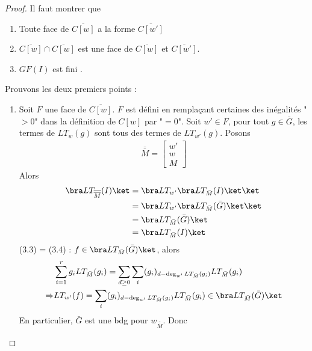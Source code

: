         \begin{proof}
            Il faut montrer que
            \begin{enumerate}
                \item Toute face de $\overline{C[w]}$ a la forme $\overline{C[w']}$
                \item $\overline{C[w]} \cap \overline{C[w]}$ est une face de $\overline{C[w]}$ et $\overline{C[w']}$.
                \item $GF(I)$ est fini .
            \end{enumerate}
            Prouvons les deux premiers points :
            \begin{enumerate}
                \item Soit $F$ une face de $\overline{C[w]}$. $F$ est défini en remplaçant certaines des inégalités "$>0$" dans la définition de $C[w]$ par "$=0$". Soit $w' \in F$, pour tout $g \in \bar G$, les termes de $LT_w(g)$ sont tous des termes de $LT_{w'}(g)$. Posons
                \begin{align*}
                    \overline{\overline{M}} = \begin{bmatrix} w' \\ w \\ M \end{bmatrix}
                \end{align*}
                Alors
                \begin{align}
                    \bra LT_{\overline{\overline{M}}}(I) \ket &= \bra LT_{w'} \bra LT_{\bar M}(I) \ket \ket \\
                    &= \bra LT_{w'} \bra LT_{\bar M}(\bar G) \ket \ket \\
                    &= \bra LT_{\bar M}(\bar G) \ket \\
                    &= \bra LT_{\bar M}(I) \ket
                \end{align}
                (3.3) = (3.4) : $f \in \bra LT_{\bar M}(\bar G) \ket$, alors
                \begin{align*}
                    &\sum_{i = 1}^r g_i LT_{\bar M}(g_i) = \sum_{d \geq 0} \sum_i (g_i)_{d - \deg_{w'}LT_{\bar M}(g_i)} LT_{\bar M}(g_i) \\
                    \Rightarrow &LT_{w'}(f) = \sum_i (g_i)_{d - \deg_{w'}LT_{\bar M}(g_i)} LT_{\bar M}(g_i) \in \bra LT_{\bar M}(\bar G) \ket 
                \end{align*}
                En particulier, $\bar G$ est une bdg pour $w_{\overline{\overline{M}}}$. Donc

\end{enumerate}
\end{proof}
